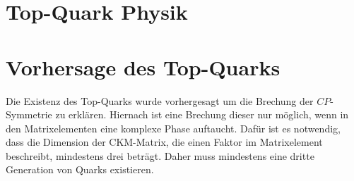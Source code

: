 \section{Top-Quark Physik}
\section{Vorhersage des Top-Quarks}
Die Existenz des Top-Quarks wurde vorhergesagt um die Brechung der $CP$-Symmetrie zu erklären. Hiernach ist eine Brechung dieser nur möglich, wenn in den Matrixelementen eine komplexe Phase auftaucht. Dafür ist es notwendig, dass die Dimension der CKM-Matrix, die einen Faktor im Matrixelement beschreibt, mindestens drei beträgt. Daher muss mindestens eine dritte Generation von Quarks existieren. 
 
